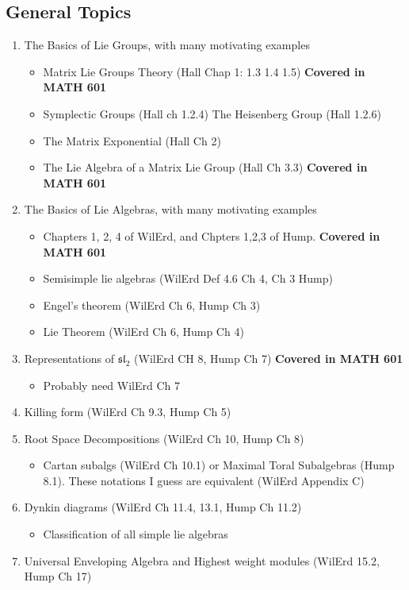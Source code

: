 \documentclass[12pt]{amsart}
\begin{document}
\subsection*{General Topics}
\begin{enumerate}
    \item The Basics of Lie Groups, with many motivating examples
    \begin{itemize}
        \item Matrix Lie Groups Theory (Hall Chap 1: 1.3 1.4 1.5) \textbf{Covered in MATH 601}
        \item Symplectic Groups (Hall ch 1.2.4) The Heisenberg Group (Hall 1.2.6)
        \item The Matrix Exponential (Hall Ch 2)
        \item The Lie Algebra of a Matrix Lie Group (Hall Ch 3.3) \textbf{Covered in MATH 601}
    \end{itemize}
    \item The Basics of Lie Algebras, with many motivating examples
    \begin{itemize}
        \item Chapters 1, 2, 4 of WilErd, and Chpters 1,2,3 of Hump. \textbf{Covered in MATH 601}
        \item Semisimple lie algebras (WilErd Def 4.6 Ch 4, Ch 3 Hump)
        \item Engel's theorem (WilErd Ch 6, Hump Ch 3)
        \item Lie Theorem (WilErd Ch 6, Hump Ch 4)
    \end{itemize}
    \item Representations of $\mathfrak{sl}_2$ (WilErd CH 8, Hump Ch 7) \textbf{Covered in MATH 601}
    \begin{itemize}
        \item Probably need WilErd Ch 7
    \end{itemize}
    \item Killing form (WilErd Ch 9.3, Hump Ch 5)
    \item Root Space Decompositions (WilErd Ch 10, Hump Ch 8)
    \begin{itemize}
        \item Cartan subalgs (WilErd Ch 10.1) or Maximal Toral 
        Subalgebras (Hump 8.1). These notations I guess are 
        equivalent (WilErd Appendix C)
    \end{itemize}
    \item Dynkin diagrams  (WilErd Ch 11.4, 13.1, Hump Ch 11.2)
    \begin{itemize}
        \item Classification of all simple lie algebras
    \end{itemize}
    \item Universal Enveloping Algebra and Highest weight modules (WilErd 15.2, Hump Ch 17)
\end{enumerate}
\end{document}
